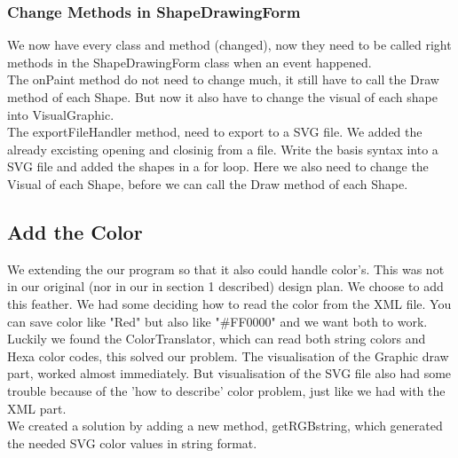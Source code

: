 \documentclass[a4paper,12pt]{article}
\begin{document}
\subsubsection{Change Methods in ShapeDrawingForm}
We now have every class and method (changed), now they need to be called right methods in the ShapeDrawingForm class when an event happened. 
\\
The onPaint method do not need to change much, it still have to call the Draw method of each Shape. But now it also have to change the visual of each shape into VisualGraphic.
\\
The exportFileHandler method, need to export to a SVG file. We added the already excisting opening and closinig from a file. Write the basis syntax into a SVG file and added the shapes in a for loop. Here we also need to change the Visual of each Shape, before we can call the Draw method of each Shape.

\subsection{Add the Color}
We extending the our program so that it also could handle color's. This was not in our original (nor in our in section 1 described) design plan. We choose to add this feather. We had some deciding how to read the color from the XML file. You can save color like "Red" but also like "\#FF0000" and we want both to work. Luckily we found the ColorTranslator, which can read both string colors and Hexa color codes, this solved our problem. The visualisation of the Graphic draw part, worked almost immediately. But visualisation of the SVG file also had some trouble because of the 'how to describe' color problem, just like we had with the XML part.
\\
We created a solution by adding a new method, getRGBstring, which generated the needed SVG color values in string format. 

\end{document}
